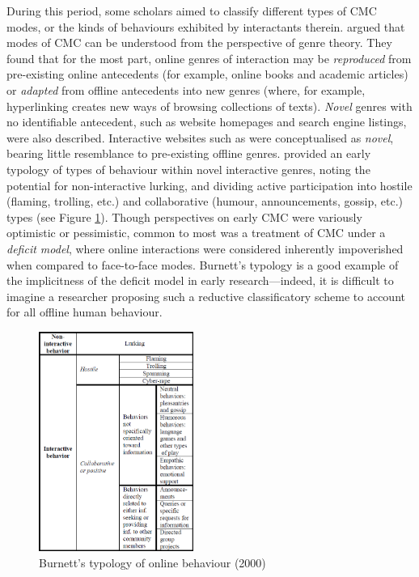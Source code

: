 During this period, some scholars aimed to classify different types of \gls{CMC} modes, or the kinds of behaviours exhibited by interactants therein. \textcite{crowston_reproduced_2000} argued that modes of \gls{CMC} can be understood from the perspective of genre theory. They found that for the most part, online genres of interaction may be \emph{reproduced} from pre-existing online antecedents (for example, online books and academic articles) or \emph{adapted} from offline antecedents into new genres (where, for example, hyperlinking creates new ways of browsing collections of texts). \emph{Novel} genres with no identifiable antecedent, such as website homepages and search engine listings, were also described. Interactive websites such as  were conceptualised as \emph{novel}, bearing little resemblance to pre-existing offline genres. \textcite{burnett_information_2000} provided an early typology of types of behaviour within novel interactive genres, noting the potential for non\hyp{}interactive lurking, and dividing active participation into hostile (flaming, trolling, etc.) and collaborative (humour, announcements, gossip, etc.) types (see Figure \ref{fig:burnett}). Though perspectives on early \gls{CMC} were variously optimistic or pessimistic, common to most was a treatment of \gls{CMC} under a \emph{deficit model}, where online interactions were considered inherently impoverished when compared to face\hyp{}to\hyp{}face modes. Burnett's typology is a good example of the implicitness of the deficit model in early research---indeed, it is difficult to imagine a researcher proposing such a reductive classificatory scheme to account for all offline human behaviour.

\begin{figure}[htb]
\centering
\includegraphics[width=0.45\textwidth]{../images/burnett.png}
\caption[Burnett's typology of online behaviour]{Burnett's typology of online behaviour (2000)}
\label{fig:burnett}
\end{figure}

